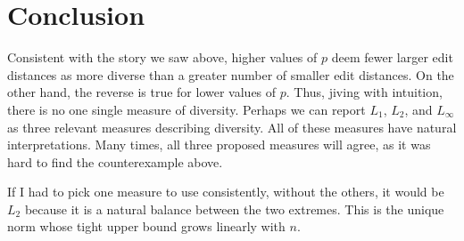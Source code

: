 \documentclass{article}
\begin{document}
\section{Conclusion}

Consistent with the story we saw above, higher values of $p$ deem
fewer larger edit distances as more diverse than a greater number of
smaller edit distances.  On the other hand, the reverse is true for
lower values of $p$.  Thus, jiving with intuition, there is no one
single measure of diversity.  Perhaps we can report $L_1$, $L_2$, and
$L_\infty$ as three relevant measures describing diversity.  All of
these measures have natural interpretations.  Many times, all three
proposed measures will agree, as it was hard to find the
counterexample above.

If I had to pick one measure to use consistently, without the others,
it would be $L_2$ because it is a natural balance between the two
extremes.  This is the unique norm whose tight upper bound grows
linearly with $n$.
\end{document}
